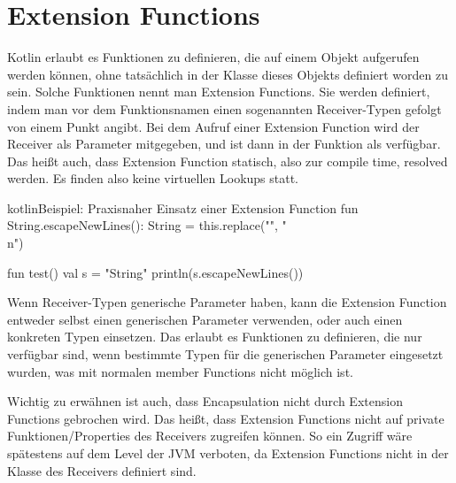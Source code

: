
\section{Extension Functions}\label{sec:extension-functions}

\renewcommand{\kapitelautor}{Autor: Marvin Kurka}

Kotlin erlaubt es Funktionen zu definieren, die auf einem Objekt aufgerufen werden können, ohne tatsächlich in der
Klasse dieses Objekts definiert worden zu sein.
Solche Funktionen nennt man Extension Functions.
Sie werden definiert, indem man vor dem Funktionsnamen einen sogenannten Receiver-Typen gefolgt von einem Punkt angibt.
Bei dem Aufruf einer Extension Function wird der Receiver als Parameter mitgegeben, und ist dann in der Funktion als
 verfügbar.
Das heißt auch, dass Extension Function statisch, also zur compile time, resolved werden.
Es finden also keine virtuellen Lookups statt.\cite{kdocExtensions}

\begin{codeBlock}{kotlin}{Beispiel: Praxisnaher Einsatz einer Extension Function}
fun String.escapeNewLines(): String = this.replace("\n", "\\n")

fun test() {
    val s = "String\nwith\nNewlines"
    println(s.escapeNewLines())
}
\end{codeBlock}

Wenn Receiver-Typen generische Parameter haben, kann die Extension Function entweder selbst einen generischen Parameter
verwenden, oder auch einen konkreten Typen einsetzen.
Das erlaubt es Funktionen zu definieren, die nur verfügbar sind, wenn bestimmte Typen für die generischen Parameter
eingesetzt wurden, was mit normalen member Functions nicht möglich ist.\cite{kdocExtensions}


Wichtig zu erwähnen ist auch, dass Encapsulation nicht durch Extension Functions gebrochen wird.
Das heißt, dass Extension Functions nicht auf private Funktionen/Properties des Receivers zugreifen können.
So ein Zugriff wäre spätestens auf dem Level der JVM verboten, da Extension Functions nicht in der Klasse des Receivers
definiert sind.

